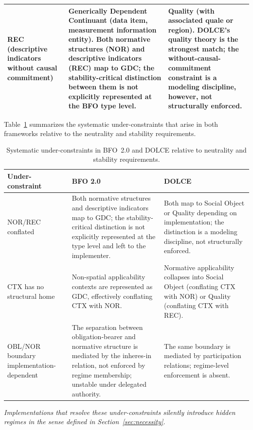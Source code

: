 \begin{table}[!htbp]
\begin{tabular}{@{} p{1.5cm} p{5.2cm} p{4.7cm}@{}}
REC (descriptive indicators without causal commitment) &
Generically Dependent Continuant (data item,
measurement information entity).
Both normative structures (NOR) and descriptive indicators (REC)
map to GDC; the stability-critical distinction between them
is not explicitly represented at the BFO type level. &
Quality (with associated quale or region).
DOLCE's quality theory is the strongest match;
the without-causal-commitment constraint is a modeling
discipline, however, not structurally enforced. \\

\bottomrule
\end{tabular}
\end{table}

Table~\ref{tab:underconstraints} summarizes the systematic under-constraints
that arise in both frameworks relative to the neutrality and stability requirements.

\begin{table}[!hb]
\centering
\caption{Systematic under-constraints in BFO~2.0 and DOLCE relative to
neutrality and stability requirements.}
\label{tab:underconstraints}
\small
\renewcommand{\arraystretch}{1.35}
\begin{tabular}{@{} p{2cm} p{4.7cm} p{4.7cm} @{}}
\toprule
\textbf{Under-constraint} & \textbf{BFO 2.0} & \textbf{DOLCE} \\
\midrule


NOR/REC conflated &
Both normative structures and descriptive indicators map to GDC;
the stability-critical distinction is not explicitly represented
at the type level and left to the implementer. &
Both map to Social Object or Quality depending on implementation;
the distinction is a modeling discipline, not structurally enforced. \\

CTX has no structural home &
Non-spatial applicability contexts are represented as GDC, effectively
conflating CTX with NOR. &
Normative applicability collapses into Social Object (conflating CTX
with NOR) or Quality (conflating CTX with REC). \\

OBL/NOR boundary implementation-dependent &
The separation between obligation-bearer and normative structure
is mediated by the inheres-in relation, not enforced by
regime membership; unstable under delegated authority. &
The same boundary is mediated by participation relations;
regime-level enforcement is absent. \\

\bottomrule
\end{tabular}
\smallskip
\begin{minipage}{\textwidth}
\footnotesize
\textit{Implementations that resolve these under-constraints silently
introduce hidden regimes in the sense defined in Section~\ref{sec:necessity}.}
\end{minipage}
\end{table}

